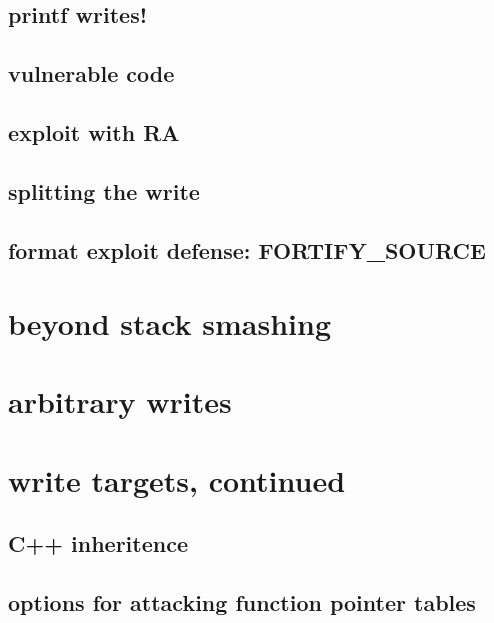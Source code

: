 \subsection{printf writes!}


\subsection{vulnerable code}


\subsection{exploit with RA}


\subsection{splitting the write}


\subsection{format exploit defense: FORTIFY\_SOURCE}


\section{beyond stack smashing}


\section{arbitrary writes}


\section{write targets, continued}

\subsection{C++ inheritence}


\subsection{options for attacking function pointer tables}


